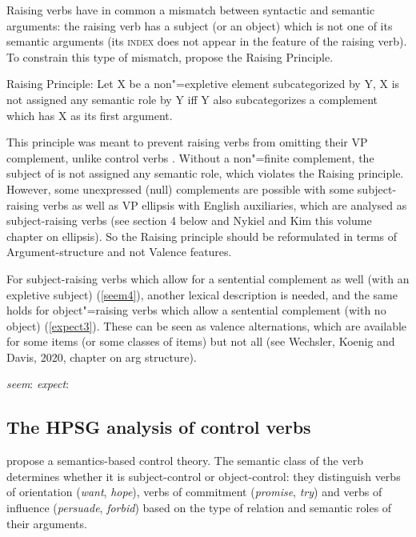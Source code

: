 \documentclass[output=paper
	        ,collection
	        ,collectionchapter
 	        ,biblatex
                ,babelshorthands
                ,newtxmath
                ,draftmode
                ,colorlinks, citecolor=brown
]{langscibook}
\begin{document}
Raising verbs have in common a mismatch between syntactic and
semantic arguments: the raising verb has a subject (or an object) which is not one of its semantic
arguments (its \textsc{index} does not appear in the \cont feature of the raising verb). To constrain this type of
mismatch, \citet[140]{PollardandSag1994} propose the Raising Principle.

\begin{exe}
\ex Raising Principle: Let X be a non"=expletive element subcategorized by Y, X is not assigned any semantic role by Y iff Y also subcategorizes a complement which has X as its first argument.
\end{exe}

This principle was meant to prevent raising verbs from omitting their VP complement, unlike control verbs \citep{Jacobson1990}. Without a non"=finite complement, the subject of  is not assigned any semantic role, which violates the Raising principle. However, some unexpressed (null) complements are possible with some subject-raising verbs 
as well as VP ellipsis with English auxiliaries, which are analysed as subject-raising verbs (see section 4 below and Nykiel and Kim this volume chapter on ellipsis). So the Raising principle should be reformulated in terms of Argument-structure and not Valence features.

\eal
{}
\zl

For subject-raising verbs which allow for a sentential complement as well (with an expletive subject) (\ref{seem4}), another lexical description is needed, and the same holds for object"=raising verbs which allow a sentential complement (with no object) (\ref{expect3}). These can be seen as valence alternations, which are available for some items (or some classes of items) but not all (see Wechsler, Koenig and Davis, 2020, chapter on arg structure).

\eal
\ex \emph{seem}:   \argst {}
\ex \emph{expect}: \argst {}
\zl

\subsection{The HPSG analysis of control verbs}

\citet{SagandPollard1991} propose a semantics-based control theory. The semantic class of the verb determines whether it is subject-control or object-control: they distinguish verbs of orientation (\emph{want}, \emph{hope}), verbs of commitment (\emph{promise}, \emph{try}) and verbs of influence (\emph{persuade}, \emph{forbid}) based on the type of relation and semantic roles of their arguments. 
\end{document}
